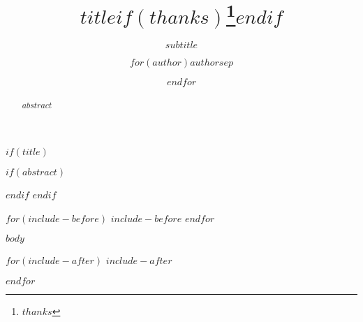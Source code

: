 \documentclass{jopsubmission}
\date{\vspace{-5ex}}
\title{$title$$if(thanks)$\thanks{$thanks$}$endif$}
\subtitle{$subtitle$}
\author{$for(author)$$author$$sep$ \and $endfor$}
\begin{document}
$if(title)$
    \maketitle
    $if(abstract)$
        \begin{abstract}
        $abstract$
        \end{abstract}
    $endif$
$endif$

$for(include-before)$
$include-before$
$endfor$

$body$

$for(include-after)$
$include-after$

$endfor$
\end{document}
